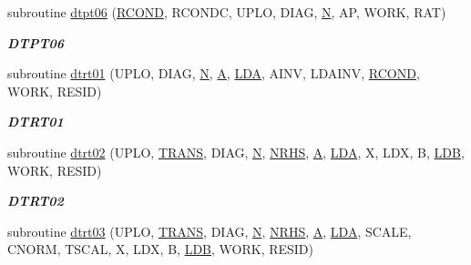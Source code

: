 \begin{DoxyCompactItemize}
subroutine \hyperlink{group__double__lin_ga6a9d813e298c27805d98c871d0a6f107}{dtpt06} (\hyperlink{superlu__enum__consts_8h_af00a42ecad444bbda75cde1b64bd7e72a9b5c151728d8512307565994c89919d5}{R\+C\+O\+N\+D}, R\+C\+O\+N\+D\+C, U\+P\+L\+O, D\+I\+A\+G, \hyperlink{polmisc_8c_a0240ac851181b84ac374872dc5434ee4}{N}, A\+P, W\+O\+R\+K, R\+A\+T)
\begin{DoxyCompactList}\small\item\em {\bfseries D\+T\+P\+T06} \end{DoxyCompactList}\item 
subroutine \hyperlink{group__double__lin_ga57e404469b80d0f64f5d0728c00fce06}{dtrt01} (U\+P\+L\+O, D\+I\+A\+G, \hyperlink{polmisc_8c_a0240ac851181b84ac374872dc5434ee4}{N}, \hyperlink{classA}{A}, \hyperlink{example__user_8c_ae946da542ce0db94dced19b2ecefd1aa}{L\+D\+A}, A\+I\+N\+V, L\+D\+A\+I\+N\+V, \hyperlink{superlu__enum__consts_8h_af00a42ecad444bbda75cde1b64bd7e72a9b5c151728d8512307565994c89919d5}{R\+C\+O\+N\+D}, W\+O\+R\+K, R\+E\+S\+I\+D)
\begin{DoxyCompactList}\small\item\em {\bfseries D\+T\+R\+T01} \end{DoxyCompactList}\item 
subroutine \hyperlink{group__double__lin_ga77a6834b7f998b6453293ce34eaac960}{dtrt02} (U\+P\+L\+O, \hyperlink{superlu__enum__consts_8h_a0c4e17b2d5cea33f9991ccc6a6678d62a1f61e3015bfe0f0c2c3fda4c5a0cdf58}{T\+R\+A\+N\+S}, D\+I\+A\+G, \hyperlink{polmisc_8c_a0240ac851181b84ac374872dc5434ee4}{N}, \hyperlink{example__user_8c_aa0138da002ce2a90360df2f521eb3198}{N\+R\+H\+S}, \hyperlink{classA}{A}, \hyperlink{example__user_8c_ae946da542ce0db94dced19b2ecefd1aa}{L\+D\+A}, X, L\+D\+X, B, \hyperlink{example__user_8c_a50e90a7104df172b5a89a06c47fcca04}{L\+D\+B}, W\+O\+R\+K, R\+E\+S\+I\+D)
\begin{DoxyCompactList}\small\item\em {\bfseries D\+T\+R\+T02} \end{DoxyCompactList}\item 
subroutine \hyperlink{group__double__lin_gacc1d8af235a0f4f71d76cd6753466a7b}{dtrt03} (U\+P\+L\+O, \hyperlink{superlu__enum__consts_8h_a0c4e17b2d5cea33f9991ccc6a6678d62a1f61e3015bfe0f0c2c3fda4c5a0cdf58}{T\+R\+A\+N\+S}, D\+I\+A\+G, \hyperlink{polmisc_8c_a0240ac851181b84ac374872dc5434ee4}{N}, \hyperlink{example__user_8c_aa0138da002ce2a90360df2f521eb3198}{N\+R\+H\+S}, \hyperlink{classA}{A}, \hyperlink{example__user_8c_ae946da542ce0db94dced19b2ecefd1aa}{L\+D\+A}, S\+C\+A\+L\+E, C\+N\+O\+R\+M, T\+S\+C\+A\+L, X, L\+D\+X, B, \hyperlink{example__user_8c_a50e90a7104df172b5a89a06c47fcca04}{L\+D\+B}, W\+O\+R\+K, R\+E\+S\+I\+D)

\end{DoxyCompactItemize}
